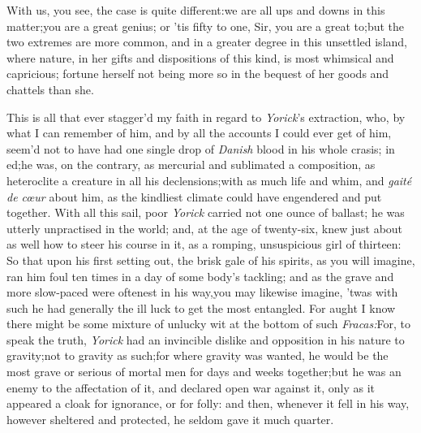 \documentclass{article}
\begin{document}
With us, you see, the case is quite\break
different:\tsk  we are all ups and downs in 
this matter;\tsk  you are a great genius;\tsk\break  
or ’tis fifty to one, Sir, you are a great
to;\tsk  but the two extremes are more common, and in a
greater degree in this unsettled island, where nature, in her gifts
and dispositions of this kind, is most whimsical and capricious;
fortune herself not being more so in the bequest of her goods and
chattels than she.

This is all that ever stagger’d my faith in regard to
\textit{Yorick}’s extraction, who, by what I can remember of
him, and by all 
the accounts I could ever get of him,\break
seem’d not to have had one single drop\break
of \textit{Danish} blood in his whole crasis; in\break
{}
ed;\tsk  he was, on the contrary, as mercurial and
sublimated a composition,\tsk\break
as heteroclite a creature in all
his declensions;\tsk  with as much life and whim, and
\textit{gaité de cœur} about him, as the kindliest
climate could have engendered and put together. With all this sail,
poor \textit{Yorick} carried not one ounce of ballast; he was utterly
unpractised in the world; and, at the age of twenty-six, knew just
about as well how to steer his course in it, as a romping,
unsuspicious girl of thirteen: So that upon his first setting out,
the brisk gale of his spirits, as you will imagine, ran him foul
ten times in a day of some body’s tackling; and as the grave
and more slow-paced were oftenest in his way,\tsh  you may
likewise imagine, ’twas with such he had generally the ill
luck to get the most entangled. For aught I know there might be
some mixture of unlucky wit at the bottom of such
\textit{Fracas:}\tsh  For, to speak the truth, \textit{Yorick}
had an invincible dislike and opposition in his nature to
gravity;\tsk  not to gravity as such;\tsk  for where gravity was
wanted, he would be the most grave or serious of mortal men for
days and weeks together;\tsk  but he was an enemy to the
affectation of it, and declared open war against it, only as it
appeared a cloak for ignorance, or for folly: and then, whenever it
fell in his way, however sheltered and protected, he seldom gave it
much quarter.
\end{document}
